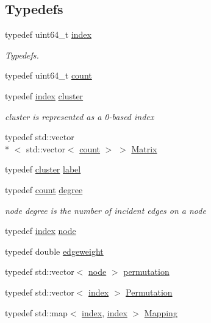 \subsection*{Typedefs}
\begin{DoxyCompactItemize}
\item 
typedef uint64\-\_\-t \hyperlink{namespace_networ_kit_a486772e5516be73694ef0d780b828d04}{index}
\begin{DoxyCompactList}\small\item\em Typedefs. \end{DoxyCompactList}\item 
typedef uint64\-\_\-t \hyperlink{namespace_networ_kit_a76b399edfa50ae72e4aa86007aaa800a}{count}
\item 
typedef \hyperlink{namespace_networ_kit_a486772e5516be73694ef0d780b828d04}{index} \hyperlink{namespace_networ_kit_a189884f50c41226806b31842d2214b71}{cluster}
\begin{DoxyCompactList}\small\item\em cluster is represented as a 0-\/based index \end{DoxyCompactList}\item 
typedef std\-::vector\\*
$<$ std\-::vector$<$ \hyperlink{namespace_networ_kit_a76b399edfa50ae72e4aa86007aaa800a}{count} $>$ $>$ \hyperlink{namespace_networ_kit_a8ffda1b15bdb5e602d3e26792f6c5a42}{Matrix}
\item 
typedef \hyperlink{namespace_networ_kit_a189884f50c41226806b31842d2214b71}{cluster} \hyperlink{namespace_networ_kit_ac69c3c44330ab5fc70f953f6699e46a9}{label}
\item 
typedef \hyperlink{namespace_networ_kit_a76b399edfa50ae72e4aa86007aaa800a}{count} \hyperlink{namespace_networ_kit_a48d18919ac945df34215375cfaa915bc}{degree}
\begin{DoxyCompactList}\small\item\em node degree is the number of incident edges on a node \end{DoxyCompactList}\item 
typedef \hyperlink{namespace_networ_kit_a486772e5516be73694ef0d780b828d04}{index} \hyperlink{namespace_networ_kit_a53fe3e4fd04ea024160e4d024dfebadf}{node}
\item 
typedef double \hyperlink{namespace_networ_kit_a831b108dbcd79dad062d9e28b1b4e3dd}{edgeweight}
\item 
typedef std\-::vector$<$ \hyperlink{namespace_networ_kit_a53fe3e4fd04ea024160e4d024dfebadf}{node} $>$ \hyperlink{namespace_networ_kit_a678dd9486623fd8b4aafa2808c54ae25}{permutation}
\item 
typedef std\-::vector$<$ \hyperlink{namespace_networ_kit_a486772e5516be73694ef0d780b828d04}{index} $>$ \hyperlink{namespace_networ_kit_a317f438a33aa8c85999a934388562a8b}{Permutation}
\item 
typedef std\-::map$<$ \hyperlink{namespace_networ_kit_a486772e5516be73694ef0d780b828d04}{index}, \hyperlink{namespace_networ_kit_a486772e5516be73694ef0d780b828d04}{index} $>$ \hyperlink{namespace_networ_kit_a9cf9c3fa376aa037afede3d68e3e9eb1}{Mapping}
\end{DoxyCompactItemize}
